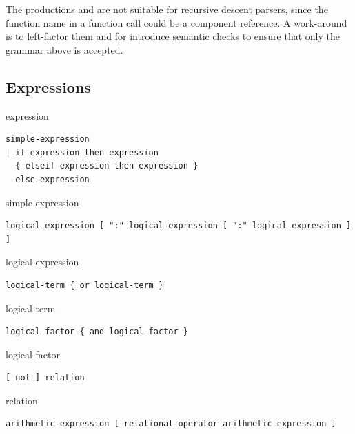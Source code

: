 \begin{nonnormative}
The productions  and  are not suitable for recursive descent parsers, since the function name in a function call could be a component reference.
A work-around is to left-factor them and for  introduce semantic checks to ensure that only the grammar above is accepted.
\end{nonnormative}


\subsection{Expressions}\label{expressions1}

\begin{production}{expression}
\begin{lstlisting}
simple-expression
| if expression then expression
  { elseif expression then expression }
  else expression
\end{lstlisting}
\end{production}

\begin{production}{simple-expression}
\begin{lstlisting}
logical-expression [ ":" logical-expression [ ":" logical-expression ] ]
\end{lstlisting}
\end{production}

\begin{production}{logical-expression}
\begin{lstlisting}
logical-term { or logical-term }
\end{lstlisting}
\end{production}

\begin{production}{logical-term}
\begin{lstlisting}
logical-factor { and logical-factor }
\end{lstlisting}
\end{production}

\begin{production}{logical-factor}
\begin{lstlisting}
[ not ] relation
\end{lstlisting}
\end{production}

\begin{production}{relation}
\begin{lstlisting}
arithmetic-expression [ relational-operator arithmetic-expression ]
\end{lstlisting}
\end{production}

